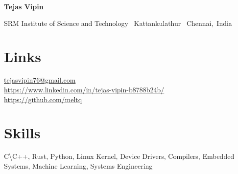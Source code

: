 \documentclass{OpenCV}
\newlength{\hvspace}
\begin{document}
\begin{center}
    \noindent\textbf{\LARGE Tejas Vipin} \\
\end{center}
\vspace{\hvspace}
\hrulefill
\vspace{\hvspace}
\begin{center}
    \noindent SRM Institute of Science and Technology \textbullet\ Kattankulathur \textbullet\ Chennai,\, India \\
\end{center}
\vspace{\hvspace}
\vspace{-4pt}
\hrulefill
\vspace{-12pt}

\section*{Links}
\faEnvelopeO\enskip \href{mailto:tejasvipin76@gmail.com}{tejasvipin76@gmail.com} \\
\faLinkedin\enskip\href{https://www.linkedin.com/in/tejas-vipin-b8788b24b/}{https://www.linkedin.com/in/tejas-vipin-b8788b24b/} \\
\faGithub\enskip\href{https://github.com/meltq}{https://github.com/meltq} \\

\section*{Skills}
C{\textbackslash}C++, Rust, Python, Linux Kernel, Device Drivers, Compilers, Embedded Systems, Machine Learning, Systems Engineering
% 









\end{document}
